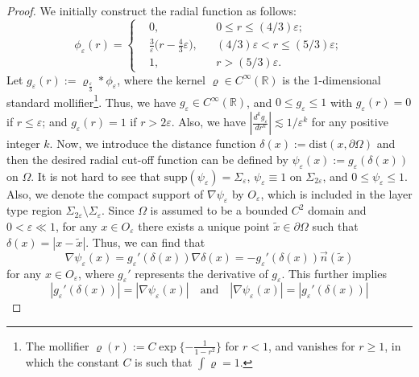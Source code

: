 \documentclass[13pt,CJK]{article}
\theoremstyle{plain}                       %
\theoremstyle{remark}
\numberwithin{equation}{section}
\begin{document}
\begin{proof}
We initially construct the radial function as follows:
\begin{equation*}
\phi_\varepsilon(r) =\left\{\begin{aligned}
&0, &&0\leq r\leq (4/3)\varepsilon;\\
&\frac{3}{\varepsilon}\big(r-\frac{4}{3}\varepsilon\big),
&&(4/3)\varepsilon< r\leq (5/3)\varepsilon;\\
&1, &&r>(5/3)\varepsilon.
\end{aligned}\right.
\end{equation*}
Let $g_\varepsilon(r):={\varrho}_{\frac{\varepsilon}{3}}\ast\phi_\varepsilon$,
where the kernel $\varrho\in C^\infty(\mathbb{R})$ is the 1-dimensional standard
mollifier\footnote{The mollifier $\varrho(r):=C\exp\{-\frac{1}{1-r^2}\}$
for $r<1$, and vanishes
for $r\geq 1$, in which the constant $C$ is such that
$\int\varrho = 1$.}. Thus, we have $g_\varepsilon\in C^\infty(\mathbb{R})$, and
$0\leq g_\varepsilon \leq 1$ with $g_\varepsilon(r) = 0$ if $r\leq \varepsilon$;
and $g_\varepsilon(r)=1$ if $r>2\varepsilon$. Also, we have
$|\frac{d^kg_\varepsilon}{dr^k}|\lesssim 1/\varepsilon^k$ for any positive integer $k$.
Now, we introduce the distance function $\delta(x) :=\text{dist}(x,\partial\Omega)$
and then the desired radial cut-off function
can be defined by $\psi_\varepsilon(x) := g_\varepsilon(\delta(x))$ on $\Omega$.
It is not hard to see that $\text{supp}(\psi_\varepsilon) = \Sigma_\varepsilon$,
$\psi_\varepsilon \equiv 1$ on $\Sigma_{2\varepsilon}$, and
$0\leq \psi_\varepsilon\leq 1$. Also, we denote the compact support of
$\nabla\psi_\varepsilon$ by $O_\varepsilon$, which is included in
the layer type region $\Sigma_{2\varepsilon}\setminus\Sigma_\varepsilon$.
Since $\Omega$ is assumed to be a bounded $C^2$ domain
and $0<\varepsilon\ll 1$, for any $x\in O_\varepsilon$
there exists a unique point $\tilde{x}\in\partial\Omega$ such that $\delta(x)
=|x-\tilde{x}|$. Thus, we can find that
\begin{equation}\label{f:4.7}
  \nabla\psi_\varepsilon(x) = g_\varepsilon'(\delta(x))\nabla\delta(x)
  = -{g}_\varepsilon'(\delta(x))\vec{n}(\tilde{x})
\end{equation}
for any $x\in O_\varepsilon$, where $g_\varepsilon'$ represents the derivative of $g_\varepsilon$.
This further implies
\begin{equation}\label{f:4.8}
 |g_\varepsilon'(\delta(x))| =|\nabla\psi_\varepsilon(x)|
 \quad \text{and} \quad
 |\nabla\psi_\varepsilon(x)| = |g_\varepsilon'(\delta(x))|

\end{equation}
\end{proof}
\end{document}

